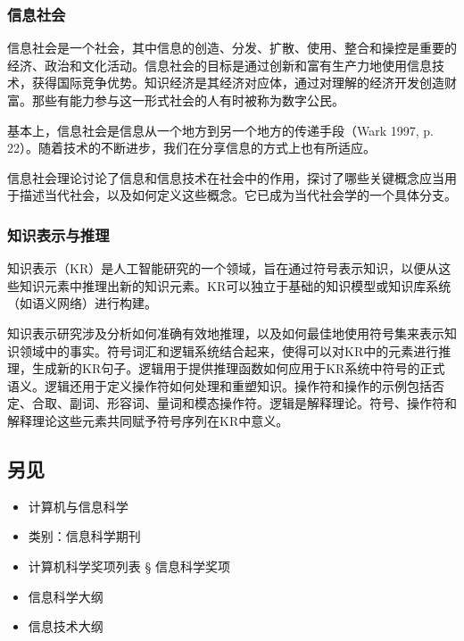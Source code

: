 \subsubsection{信息社会} 
信息社会是一个社会，其中信息的创造、分发、扩散、使用、整合和操控是重要的经济、政治和文化活动。信息社会的目标是通过创新和富有生产力地使用信息技术，获得国际竞争优势。知识经济是其经济对应体，通过对理解的经济开发创造财富。那些有能力参与这一形式社会的人有时被称为数字公民。

基本上，信息社会是信息从一个地方到另一个地方的传递手段（Wark 1997, p. 22）。随着技术的不断进步，我们在分享信息的方式上也有所适应。

信息社会理论讨论了信息和信息技术在社会中的作用，探讨了哪些关键概念应当用于描述当代社会，以及如何定义这些概念。它已成为当代社会学的一个具体分支。
\subsubsection{知识表示与推理}    
知识表示（KR）是人工智能研究的一个领域，旨在通过符号表示知识，以便从这些知识元素中推理出新的知识元素。KR可以独立于基础的知识模型或知识库系统（如语义网络）进行构建。

知识表示研究涉及分析如何准确有效地推理，以及如何最佳地使用符号集来表示知识领域中的事实。符号词汇和逻辑系统结合起来，使得可以对KR中的元素进行推理，生成新的KR句子。逻辑用于提供推理函数如何应用于KR系统中符号的正式语义。逻辑还用于定义操作符如何处理和重塑知识。操作符和操作的示例包括否定、合取、副词、形容词、量词和模态操作符。逻辑是解释理论。符号、操作符和解释理论这些元素共同赋予符号序列在KR中意义。
\subsection{另见}  
\begin{itemize}
\item 计算机与信息科学  
\item 类别：信息科学期刊  
\item 计算机科学奖项列表 § 信息科学奖项  
\item 信息科学大纲  
\item 信息技术大纲
\end{itemize}
